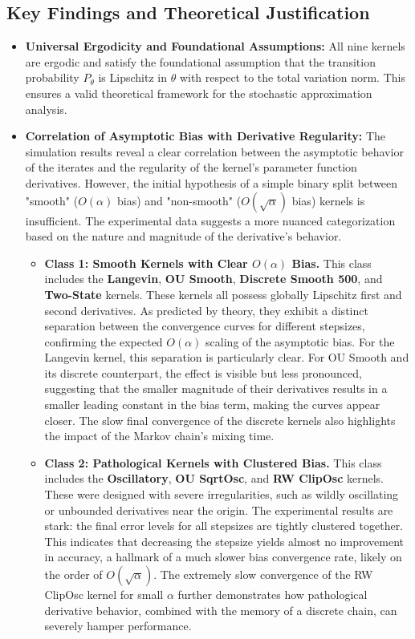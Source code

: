 \documentclass[a4paper]{article}
\begin{document}
\subsection*{Key Findings and Theoretical Justification}

\begin{itemize}
	\item \textbf{Universal Ergodicity and Foundational Assumptions:} All nine kernels are ergodic and satisfy the foundational assumption that the transition probability \(P_\theta\) is Lipschitz in \(\theta\) with respect to the total variation norm. This ensures a valid theoretical framework for the stochastic approximation analysis.
	
	\item \textbf{Correlation of Asymptotic Bias with Derivative Regularity:} The simulation results reveal a clear correlation between the asymptotic behavior of the iterates and the regularity of the kernel's parameter function derivatives. However, the initial hypothesis of a simple binary split between "smooth" ($O(\alpha)$ bias) and "non-smooth" ($O(\sqrt{\alpha})$ bias) kernels is insufficient. The experimental data suggests a more nuanced categorization based on the nature and magnitude of the derivative's behavior.
	
	\begin{itemize}
		\item \textbf{Class 1: Smooth Kernels with Clear \(O(\alpha)\) Bias.} This class includes the \textbf{Langevin}, \textbf{OU Smooth}, \textbf{Discrete Smooth 500}, and \textbf{Two-State} kernels. These kernels all possess globally Lipschitz first and second derivatives. As predicted by theory, they exhibit a distinct separation between the convergence curves for different stepsizes, confirming the expected \(O(\alpha)\) scaling of the asymptotic bias. For the Langevin kernel, this separation is particularly clear. For OU Smooth and its discrete counterpart, the effect is visible but less pronounced, suggesting that the smaller magnitude of their derivatives results in a smaller leading constant in the bias term, making the curves appear closer. The slow final convergence of the discrete kernels also highlights the impact of the Markov chain's mixing time.
		
		\item \textbf{Class 2: Pathological Kernels with Clustered Bias.} This class includes the \textbf{Oscillatory}, \textbf{OU SqrtOsc}, and \textbf{RW ClipOsc} kernels. These were designed with severe irregularities, such as wildly oscillating or unbounded derivatives near the origin. The experimental results are stark: the final error levels for all stepsizes are tightly clustered together. This indicates that decreasing the stepsize yields almost no improvement in accuracy, a hallmark of a much slower bias convergence rate, likely on the order of \(O(\sqrt{\alpha})\). The extremely slow convergence of the RW ClipOsc kernel for small \(\alpha\) further demonstrates how pathological derivative behavior, combined with the memory of a discrete chain, can severely hamper performance.
		

\end{itemize}
\end{itemize}
\end{document}

